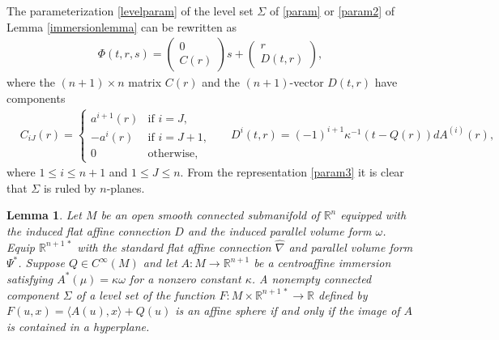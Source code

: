 \documentclass [leqno, 10pt]{amsart}
\newtheorem{lemma}[theorem]{Lemma}
\theoremstyle{definition}
\numberwithin{equation}{section}
\newcommand{\om}{\omega}
\newcommand{\ka}{\kappa}
\newcommand{\cinf}{C^{\infty}}
\newcommand{\lb}{\langle}
\newcommand{\ra}{\rangle}
\newcommand{\hnabla}{\widehat{\nabla}}
\newcommand{\rea}{\mathbb R}
\begin{document}
\begin{remark}
The parameterization \eqref{levelparam} of the level set $\Sigma$ of \eqref{param} or \eqref{param2} of Lemma \ref{immersionlemma} can be rewritten as
\begin{align}\label{param3}
\Phi(t, r, s) = \begin{pmatrix} 0 \\ C(r) \end{pmatrix}s + \begin{pmatrix} r \\ D(t, r)\end{pmatrix},
\end{align}
where the $(n+1) \times n$ matrix $C(r)$ and the $(n+1)$-vector $D(t, r)$ have components
\begin{align}
&C_{iJ}(r) = \begin{cases} a^{i+1}(r) & \text{if}\,\,i = J,\\ -a^{i}(r)&  \text{if}\,\, i = J+1,\\ 0 & \text{otherwise}, \end{cases}&& D^{i}(t, r) = (-1)^{i+1}\ka^{-1}(t - Q(r))dA^{(i)}(r),
\end{align}
where $1 \leq i \leq n+1$ and $1 \leq J \leq n$. From the representation \eqref{param3} it is clear that $\Sigma$ is ruled by $n$-planes.
\end{remark}

\begin{lemma}\label{affinespherelemma}
Let $M$ be an open smooth connected submanifold of $\rea^{n}$ equipped with the induced flat affine connection $D$ and the induced parallel volume form $\om$. Equip $\rea^{n+1\,\ast}$ with the standard flat affine connection $\hnabla$ and parallel volume form $\Psi^{\ast}$. Suppose $Q \in \cinf(M)$ and let $A:M \to \rea^{n+1}$ be a centroaffine immersion satisfying $A^{\ast}(\mu) = \ka \om$ for a nonzero constant $\ka$. A nonempty connected component $\Sigma$ of a level set of the function $F:M \times \rea^{n+1\,\ast} \to \rea$ defined by $F(u, x) =\lb A(u), x\ra + Q(u)$ is an affine sphere if and only if the image of $A$ is contained in a hyperplane.
\end{lemma}
\end{document}
